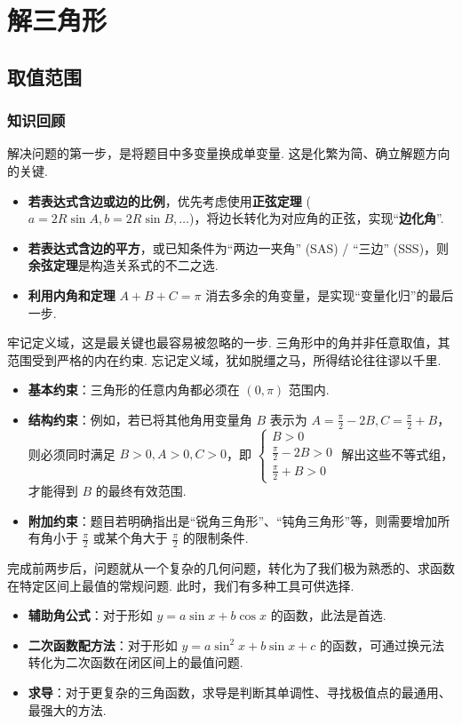 \chapter{解三角形}
\setcounter{choicecounter}{0} 

\section{取值范围}
\subsection{知识回顾}
解决问题的第一步，是将题目中多变量换成单变量. 这是化繁为简、确立解题方向的关键.
\begin{itemize}
	\item \textbf{若表达式含边或边的比例}，优先考虑使用\textbf{正弦定理} ($a=2R\sin A, b=2R\sin B, \dots$)，将边长转化为对应角的正弦，实现“\textbf{边化角}”.
	\item \textbf{若表达式含边的平方}，或已知条件为“两边一夹角” (SAS) / “三边” (SSS)，则\textbf{余弦定理}是构造关系式的不二之选. 
	\item \textbf{利用内角和定理} $A+B+C=\pi$ 消去多余的角变量，是实现“变量化归”的最后一步.
\end{itemize}

牢记定义域，这是最关键也最容易被忽略的一步. 三角形中的角并非任意取值，其范围受到严格的内在约束. 忘记定义域，犹如脱缰之马，所得结论往往谬以千里.
\begin{itemize}
	\item \textbf{基本约束}：三角形的任意内角都必须在 $(0, \pi)$ 范围内.
	\item \textbf{结构约束}：例如，若已将其他角用变量角 $B$ 表示为 $A=\frac{\pi}{2}-2B, C=\frac{\pi}{2}+B$，则必须同时满足 $B>0, A>0, C>0$，即
	$\begin{cases} B>0 \\ \frac{\pi}{2}-2B>0 \\ \frac{\pi}{2}+B>0 \end{cases}$
	解出这些不等式组，才能得到 $B$ 的最终有效范围.
	\item \textbf{附加约束}：题目若明确指出是“锐角三角形”、“钝角三角形”等，则需要增加所有角小于 $\frac{\pi}{2}$ 或某个角大于 $\frac{\pi}{2}$ 的限制条件.
\end{itemize}

完成前两步后，问题就从一个复杂的几何问题，转化为了我们极为熟悉的、求函数在特定区间上最值的常规问题. 此时，我们有多种工具可供选择.
\begin{itemize}
	\item \textbf{辅助角公式}：对于形如 $y=a\sin x + b\cos x$ 的函数，此法是首选.
	\item \textbf{二次函数配方法}：对于形如 $y=a\sin^2 x + b\sin x + c$ 的函数，可通过换元法转化为二次函数在闭区间上的最值问题.
	\item \textbf{求导}：对于更复杂的三角函数，求导是判断其单调性、寻找极值点的最通用、最强大的方法.
\end{itemize}

